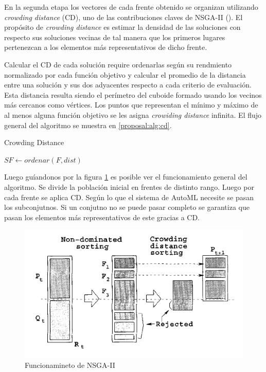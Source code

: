 En la segunda etapa los vectores de cada frente obtenido se organizan utilizando \textit{crowding distance} (CD), uno de las contribuciones claves de NSGA-II (\cite{deb2002fast}). El prop\'osito de \textit{crowding distance} es estimar la densidad de las soluciones con respecto sus soluciones vecinas de tal manera que los primeros lugares pertenezcan a los elementos m\'as representativos de dicho frente.

Calcular el CD de cada soluci\'on require ordenarlas seg\'un su rendmiento normalizado por cada funci\'on objetivo y calcular el promedio de la distancia entre una soluci\'on y sus dos adyacentes respecto a cada criterio de evaluaci\'on. Esta distancia resulta siendo el per\'imetro del cuboide formado usando los vecinos m\'as cercanos como v\'ertices. Los puntos que representan el m\'inimo y m\'aximo de al menos alguna funci\'on objetivo se les asigna \textit{crowiding distance} infinita. El flujo general del algoritmo se muestra en \ref{proposal:alg:cd}.

\begin{algorithm*}[H]\caption{Crowding Distance}\label{proposal:alg:cd}

    $SF \gets ordenar(F, dist)$ 

\end{algorithm*}

Luego gu\'iandonos por la figura \ref{proposal:fig:nsga2} es posible ver el funcionamiento general del algoritmo. Se divide la poblaci\'on inicial en frentes de distinto rango. Luego por cada frente se aplica CD. Seg\'un lo que el sistema de AutoML necesite se pasan los subconjutnos. Si un conjutno no se puede pasar completo se garantiza que pasan los elementos m\'as representativos de este gracias a CD.

\begin{figure}[ht]\caption{Funcionamineto de NSGA-II}\label{proposal:fig:nsga2}
    \centering
    \includegraphics[width=\linewidth]{Pictures/nsga2.png}
\end{figure}

